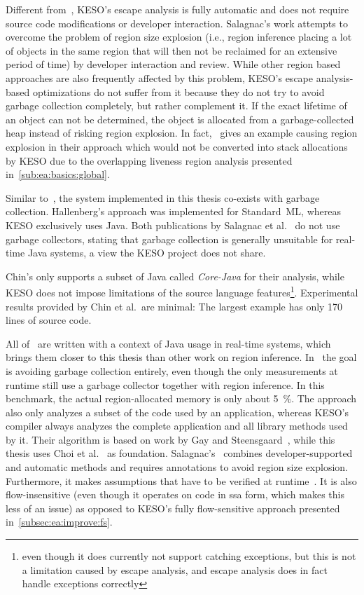 	Different from~\cite{grossman:02:pldi, salagnac:07:rtcsa}, KESO's escape analysis is fully automatic and does not
	require source code modifications or developer interaction. Salagnac's work attempts to overcome the problem of region
	size explosion (i.e., region inference placing a lot of objects in the same region that will then not be reclaimed for
	an extensive period of time) by developer interaction and review. While other region based approaches are also
	frequently affected by this problem, KESO's escape analysis-based optimizations do not suffer from it because they do
	not try to avoid garbage collection completely, but rather complement it. If the exact lifetime of an object can not
	be determined, the object is allocated from a garbage-collected heap instead of risking region explosion. In
	fact,~\cite{salagnac:07:rtcsa} gives an example causing region explosion in their approach which would not be
	converted into stack allocations by KESO due to the overlapping liveness region analysis presented
	in~\cref{sub:ea:basics:global}.

	Similar to~\cite{hallenberg:02:sigplan}, the system implemented in this thesis co-exists with garbage collection.
	Hallenberg's approach was implemented for Standard~ML, whereas KESO exclusively uses Java. Both publications by
	Salagnac et al.~\cite{salagnac:05:aiool, salagnac:07:rtcsa} do not use garbage collectors, stating that garbage
	collection is generally unsuitable for real-time Java systems, a view the KESO project does not share.

	Chin's \cite{chin:04:pldi} only supports a subset of Java called \emph{Core-Java} for their analysis, while KESO does
	not impose limitations of the source language features\footnote{even though it does currently not support catching
	exceptions, but this is not a limitation caused by escape analysis, and escape analysis does in fact handle exceptions
	correctly}. Experimental results provided by Chin et al.\ are minimal: The largest example has only 170 lines of
	source code.

	All of~\cite{chin:04:pldi, salagnac:05:aiool, salagnac:07:rtcsa} are written with a context of Java usage in real-time
	systems, which brings them closer to this thesis than other work on region inference. In~\cite{salagnac:05:aiool} the
	goal is avoiding garbage collection entirely, even though the only measurements at runtime still use a garbage
	collector together with region inference. In this benchmark, the actual region-allocated memory is only about 5~\%.
	The approach also only analyzes a subset of the code used by an application, whereas KESO's compiler always analyzes
	the complete application and all library methods used by it. Their algorithm is based on work by Gay and
	Steensgaard~\cite{gay:00:cc}, while this thesis uses Choi et al.~\cite{choi:03:toplas} as foundation.
	Salagnac's~\cite{salagnac:07:rtcsa} combines developer-supported and automatic methods and requires annotations to
	avoid region size explosion. Furthermore, it makes assumptions that have to be verified at
	runtime~\cite[Sec.~3.1]{salagnac:07:rtcsa}. It is also flow-insensitive (even though it operates on code in \gls{ssa}
	form, which makes this less of an issue) as opposed to KESO's fully flow-sensitive approach presented
	in~\cref{subsec:ea:improve:fs}.
